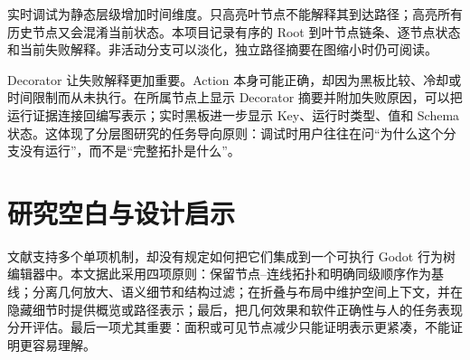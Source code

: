 实时调试为静态层级增加时间维度。只高亮叶节点不能解释其到达路径；高亮所有历史节点又会混淆当前状态。本项目记录有序的 Root 到叶节点链条、逐节点状态和当前失败解释。非活动分支可以淡化，独立路径摘要在图缩小时仍可阅读。

Decorator 让失败解释更加重要。Action 本身可能正确，却因为黑板比较、冷却或时间限制而从未执行。在所属节点上显示 Decorator 摘要并附加失败原因，可以把运行证据连接回编写表示；实时黑板进一步显示 Key、运行时类型、值和 Schema 状态。这体现了分层图研究的任务导向原则：调试时用户往往在问“为什么这个分支没有运行”，而不是“完整拓扑是什么”。

\section{研究空白与设计启示}

文献支持多个单项机制，却没有规定如何把它们集成到一个可执行 Godot 行为树编辑器中。本文据此采用四项原则：保留节点--连线拓扑和明确同级顺序作为基线；分离几何放大、语义细节和结构过滤；在折叠与布局中维护空间上下文，并在隐藏细节时提供概览或路径表示；最后，把几何效果和软件正确性与人的任务表现分开评估。最后一项尤其重要：面积或可见节点减少只能证明表示更紧凑，不能证明更容易理解。
